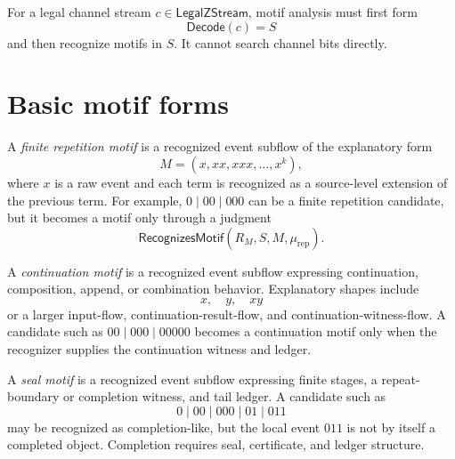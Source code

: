 \begin{corollary}
\label{cor:motif-generated-analysis-decodes-first}
For a legal channel stream $c\in\mathsf{LegalZStream}$, motif analysis must first form
$$
  \mathsf{Decode}(c)=S
$$
and then recognize motifs in $S$. It cannot search channel bits directly.
\end{corollary}

\section{Basic motif forms}
\label{sec:motif-generated-basic-forms}

\begin{definition}
\label{def:motif-generated-finite-repetition}
A \emph{finite repetition motif} is a recognized event subflow of the explanatory form
$$
  M=(x,xx,xxx,\ldots,x^k),
$$
where $x$ is a raw event and each term is recognized as a source-level extension of the previous term. For example, $0\mid 00\mid 000$ can be a finite repetition candidate, but it becomes a motif only through a judgment
$$
  \mathsf{RecognizesMotif}(R_M,S,M,\mu_{\mathrm{rep}}).
$$
\end{definition}

\begin{definition}
\label{def:motif-generated-continuation}
A \emph{continuation motif} is a recognized event subflow expressing continuation, composition, append, or combination behavior. Explanatory shapes include
$$
  x,\quad y,\quad xy
$$
or a larger input-flow, continuation-result-flow, and continuation-witness-flow. A candidate such as $00\mid 000\mid 00000$ becomes a continuation motif only when the recognizer supplies the continuation witness and ledger.
\end{definition}

\begin{definition}
\label{def:motif-generated-seal}
A \emph{seal motif} is a recognized event subflow expressing finite stages, a repeat-boundary or completion witness, and tail ledger. A candidate such as
$$
  0\mid 00\mid 000\mid 01\mid 011
$$
may be recognized as completion-like, but the local event $011$ is not by itself a completed object. Completion requires seal, certificate, and ledger structure.
\end{definition}

